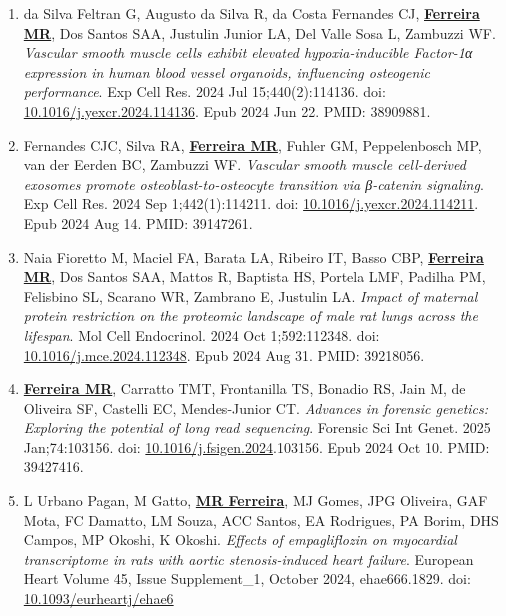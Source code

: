 \documentclass[
  letterpaper,
  DIV=11,
  numbers=noendperiod]{scrartcl}
\begin{document}
\begin{enumerate}
{  hippocampus}. Brain Res. 2024 Jun 15;1833:148866. doi:
  \href{https://www.doi.org/10.1016/j.brainres.2024.148866}{10.1016/j.brainres.2024.148866}.
  Epub 2024 Mar 15. PMID: 38494098.
\item
  da Silva Feltran G, Augusto da Silva R, da Costa Fernandes CJ,
  \ul{\textbf{Ferreira MR}}, Dos Santos SAA, Justulin Junior LA, Del
  Valle Sosa L, Zambuzzi WF. \emph{Vascular smooth muscle cells exhibit
  elevated hypoxia-inducible Factor-1α expression in human blood vessel
  organoids, influencing osteogenic performance}. Exp Cell Res. 2024 Jul
  15;440(2):114136. doi:
  \href{https://www.doi.org/10.1016/j.yexcr.2024.114136}{10.1016/j.yexcr.2024.114136}.
  Epub 2024 Jun 22. PMID: 38909881.
\item
  Fernandes CJC, Silva RA, \ul{\textbf{Ferreira MR}}, Fuhler GM,
  Peppelenbosch MP, van der Eerden BC, Zambuzzi WF. \emph{Vascular
  smooth muscle cell-derived exosomes promote osteoblast-to-osteocyte
  transition via β-catenin signaling}. Exp Cell Res. 2024 Sep
  1;442(1):114211. doi:
  \href{https://www.doi.org/10.1016/j.yexcr.2024.114211}{10.1016/j.yexcr.2024.114211}.
  Epub 2024 Aug 14. PMID: 39147261.
\item
  Naia Fioretto M, Maciel FA, Barata LA, Ribeiro IT, Basso CBP,
  \ul{\textbf{Ferreira MR}}, Dos Santos SAA, Mattos R, Baptista HS,
  Portela LMF, Padilha PM, Felisbino SL, Scarano WR, Zambrano E,
  Justulin LA. \emph{Impact of maternal protein restriction on the
  proteomic landscape of male rat lungs across the lifespan}. Mol Cell
  Endocrinol. 2024 Oct 1;592:112348. doi:
  \href{https://www.doi.org/10.1016/j.mce.2024.112348}{10.1016/j.mce.2024.112348}.
  Epub 2024 Aug 31. PMID: 39218056.
\item
  \ul{\textbf{Ferreira MR}}, Carratto TMT, Frontanilla TS, Bonadio RS,
  Jain M, de Oliveira SF, Castelli EC, Mendes-Junior CT. \emph{Advances
  in forensic genetics: Exploring the potential of long read
  sequencing}. Forensic Sci Int Genet. 2025 Jan;74:103156. doi:
  \href{https://www.doi.org/10.1016/j.fsigen.2024}{10.1016/j.fsigen.2024}.103156.
  Epub 2024 Oct 10. PMID: 39427416.
\item
  L Urbano Pagan, M Gatto, \ul{\textbf{MR Ferreira}}, MJ Gomes, JPG
  Oliveira, GAF Mota, FC Damatto, LM Souza, ACC Santos, EA Rodrigues, PA
  Borim, DHS Campos, MP Okoshi, K Okoshi. \emph{Effects of empagliflozin
  on myocardial transcriptome in rats with aortic stenosis-induced heart
  failure}. European Heart Volume 45, Issue Supplement\_1, October 2024,
  ehae666.1829. doi:
  \href{https://doi.org/10.1093/eurheartj/ehae666.1829}{10.1093/eurheartj/ehae6}

\end{enumerate}
\end{document}
